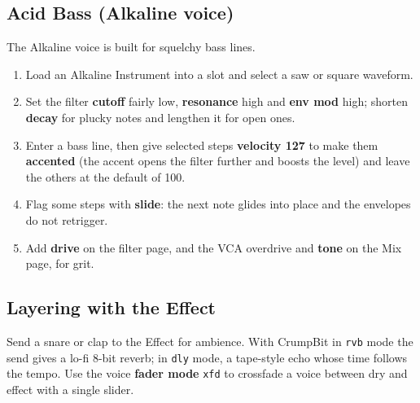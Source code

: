 \subsection{Acid Bass (Alkaline voice)}\label{acid-bass-alkaline-voice}

The Alkaline voice is built for squelchy bass lines.

\begin{enumerate}
\def\labelenumi{\arabic{enumi}.}
\tightlist
\item
  Load an Alkaline Instrument into a slot and select a saw or square
  waveform.
\item
  Set the filter \textbf{cutoff} fairly low, \textbf{resonance} high and
  \textbf{env mod} high; shorten \textbf{decay} for plucky notes and
  lengthen it for open ones.
\item
  Enter a bass line, then give selected steps \textbf{velocity 127} to
  make them \textbf{accented} (the accent opens the filter further and
  boosts the level) and leave the others at the default of 100.
\item
  Flag some steps with \textbf{slide}: the next note glides into place
  and the envelopes do not retrigger.
\item
  Add \textbf{drive} on the filter page, and the VCA overdrive and
  \textbf{tone} on the Mix page, for grit.
\end{enumerate}


\subsection{Layering with the Effect}\label{layering-with-the-effect}

Send a snare or clap to the Effect for ambience. With CrumpBit in
\texttt{rvb} mode the send gives a lo-fi 8-bit reverb; in \texttt{dly}
mode, a tape-style echo whose time follows the tempo. Use the voice
\textbf{fader mode} \texttt{xfd} to crossfade a voice between dry and
effect with a single slider.
